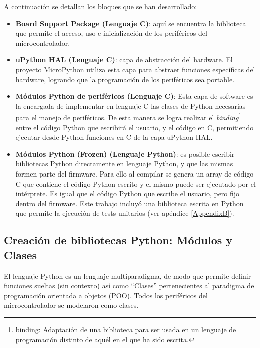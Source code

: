 A continuación se detallan los bloques que se han desarrollado:

\begin{itemize}
	\item \textbf{Board Support Package (Lenguaje C)}: aquí se encuentra la biblioteca que permite el acceso, uso e inicialización de los periféricos del microcontrolador.
	\item \textbf{uPython HAL (Lenguaje C)}: capa de abstracción del hardware. El proyecto MicroPython utiliza esta capa para abstraer funciones específicas del hardware, logrando que la programación de los periféricos sea portable.
	\item \textbf{Módulos Python de periféricos (Lenguaje C)}: Esta capa de software es la encargada de implementar en lenguaje C las clases de Python necesarias para el manejo de periféricos. De esta manera se logra realizar el \textit{binding}\footnote{binding: Adaptación de una biblioteca para ser usada en un lenguaje de programación distinto de aquél en el que ha sido escrita.} entre el código Python que escribirá el usuario, y el código en C, permitiendo ejecutar desde Python funciones en C de la capa uPython HAL.
	\item \textbf{Módulos Python (Frozen) (Lenguaje Python)}: es posible escribir bibliotecas Python directamente en lenguaje Python, y que las mismas formen parte del firmware. Para ello al compilar se genera un array de código C que contiene el código Python escrito y el mismo puede ser ejecutado por el intérprete. Es igual que el código Python que escribe el usuario, pero fijo dentro del firmware. Este trabajo incluyó una biblioteca escrita en Python que permite la ejecución de tests unitarios (ver apéndice \ref{AppendixB}).
\end{itemize}


\subsection{Creación de bibliotecas Python: Módulos y Clases} 

El lenguaje Python es un lenguaje multiparadigma, de modo que permite definir funciones sueltas (sin contexto) así como “Clases” pertenecientes al paradigma de programación orientada a objetos (POO). Todos los periféricos del microcontrolador se modelaron como clases.

